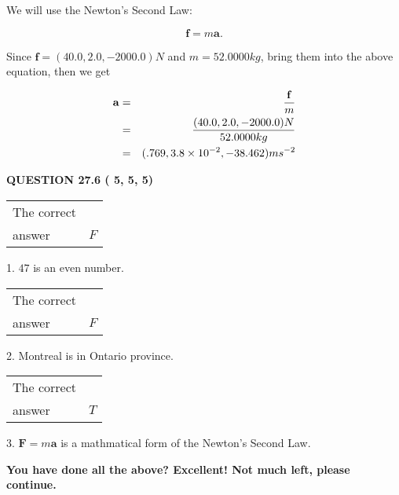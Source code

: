 \documentclass[12pt]{article}
\begin{document}
 
 
 
 
\noindent{}

We will use the Newton's Second Law:
 
\[
\mathbf{f}=m\mathbf{a}.
\]
 
Since $\mathbf{f}= %
(40.0 , 2.0 , -2000.0) N$
and $m= %
52.0000kg$, bring them into the above equation, then we get
 
\begin{eqnarray*}
\mathbf{a}&=&\frac{\mathbf{f}}m  \\
&=&\frac{ %
(40.0 , 2.0 , -2000.0) N}{ %
52.0000kg}  \\
&=& %
(.769 , 3.8 \times 10^{-2} , -38.462) ms^{-2}
\end{eqnarray*}
 
 
 
  
\vspace{0.2in}
  
{\textbf{\Large{QUESTION
27.6 
 (          5,          5,          5)
}}}
  
  
 
 
\noindent{}

 
\noindent\begin{tabular}{|l|l|}\hline The correct & \\
          answer &  %
$F$ \\ \hline \end{tabular}
1. $ %
47$ is an  %
even number.
 
\noindent\begin{tabular}{|l|l|}\hline The correct & \\
          answer &  %
$F$ \\ \hline \end{tabular}
2.  %
Montreal is in  %
Ontario province.
 
\noindent\begin{tabular}{|l|l|}\hline The correct & \\
          answer &  %
$T$ \\ \hline \end{tabular}
3.  %
$\mathbf{F}=m\mathbf{a}$ is a mathmatical form of  %
the Newton's Second Law.
 
 
 
   
   
\vspace{0.3in}
{\textbf{\LARGE{You have done all the above? Excellent! Not much left, please continue.}}}
\vspace{0.3in}
   
\end{document}
